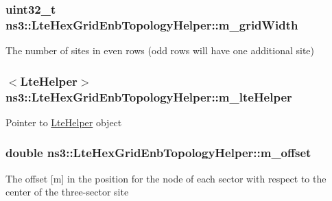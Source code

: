 \subsubsection[{\texorpdfstring{m\+\_\+grid\+Width}{m_gridWidth}}]{\setlength{\rightskip}{0pt plus 5cm}uint32\+\_\+t ns3\+::\+Lte\+Hex\+Grid\+Enb\+Topology\+Helper\+::m\+\_\+grid\+Width\hspace{0.3cm}{\ttfamily [private]}}\hypertarget{classns3_1_1LteHexGridEnbTopologyHelper_a9a1f31192fb0859dd0a3dec3f776da25}{}\label{classns3_1_1LteHexGridEnbTopologyHelper_a9a1f31192fb0859dd0a3dec3f776da25}
The number of sites in even rows (odd rows will have one additional site) 
\subsubsection[{\texorpdfstring{m\+\_\+lte\+Helper}{m_lteHelper}}]{$<${\bf Lte\+Helper}$>$ ns3\+::\+Lte\+Hex\+Grid\+Enb\+Topology\+Helper\+::m\+\_\+lte\+Helper\hspace{0.3cm}{\ttfamily [private]}}\hypertarget{classns3_1_1LteHexGridEnbTopologyHelper_a6998a2a11adc9e072926db5b03be6a28}{}\label{classns3_1_1LteHexGridEnbTopologyHelper_a6998a2a11adc9e072926db5b03be6a28}
Pointer to \hyperlink{classns3_1_1LteHelper}{Lte\+Helper} object 
\subsubsection[{\texorpdfstring{m\+\_\+offset}{m_offset}}]{\setlength{\rightskip}{0pt plus 5cm}double ns3\+::\+Lte\+Hex\+Grid\+Enb\+Topology\+Helper\+::m\+\_\+offset\hspace{0.3cm}{\ttfamily [private]}}\hypertarget{classns3_1_1LteHexGridEnbTopologyHelper_ad2c5634d5b3743e525cedec64ccaa9fe}{}\label{classns3_1_1LteHexGridEnbTopologyHelper_ad2c5634d5b3743e525cedec64ccaa9fe}
The offset \mbox{[}m\mbox{]} in the position for the node of each sector with respect to the center of the three-\/sector site 
